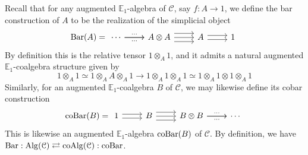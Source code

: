 	\begin{const}\label{Bar_const}
		Recall that for any augmented $\mathbb{E}_1$-algebra of $\mathcal{C}$, say $f:A\to 1$, we define the bar construction of $A$ to be the realization of the simplicial object 
		\[\mBar(A)=\begin{tikzcd}[ampersand replacement=\&]
			\cdots \& {A\otimes A} \& A \& 1
			\arrow["\cdots", from=1-1, to=1-2]
			\arrow["\cdots"', from=1-1, to=1-2]
			\arrow[from=1-2, to=1-3]
			\arrow[shift left=2, from=1-2, to=1-3]
			\arrow[shift right=2, from=1-2, to=1-3]
			\arrow[shift left, from=1-3, to=1-4]
			\arrow[shift right, from=1-3, to=1-4]
		\end{tikzcd}\]
		By definition this is the relative tensor $1\otimes_A1$, and it admits a natural augmented $\mathbb{E}_1$-coalgebra structure given by 
		\[ 1\otimes_A1\simeq 1\otimes_AA\otimes_A1\to 1\otimes_A1\otimes_A1\simeq 1\otimes_A1\otimes1\otimes_A1 \]
		Similarly, for an augmented $\mathbb{E}_1$-coalgebra $B$ of $\mathcal{C}$, we may likewise define its cobar construction 
		\[\coBar(B)=\begin{tikzcd}[ampersand replacement=\&]
			1 \& B \& {B\otimes B} \& \cdots
			\arrow[shift right, from=1-1, to=1-2]
			\arrow[shift left, from=1-1, to=1-2]
			\arrow[from=1-2, to=1-3]
			\arrow[shift right=2, from=1-2, to=1-3]
			\arrow[shift left=2, from=1-2, to=1-3]
			\arrow["\cdots"', from=1-3, to=1-4]
			\arrow["\cdots", from=1-3, to=1-4]
		\end{tikzcd}\]
		This is likewise an augmented $\mathbb{E}_1$-algebra $\operatorname{\mathrm{coBar}}(B)$ of $\mathcal{C}$. By definition, we have $\operatorname{\mathrm{Bar}}:\mathrm{Alg}(\mathcal{C})\rightleftarrows\mathrm{co}\mathrm{Alg}(\mathcal{C}):\operatorname{\mathrm{coBar}}$. 
	\end{const}

